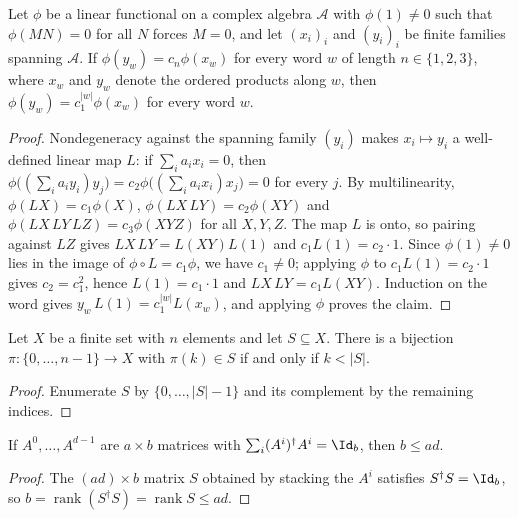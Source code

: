 \begin{lemma}
    \label{lem:block_symmetry_phase_power}
    \leanok
    Let $\phi$ be a linear functional on a complex algebra $\mathcal A$ with
    $\phi(1)\neq0$ such that $\phi(MN)=0$ for all $N$ forces $M=0$, and let
    $(x_i)_i$ and $(y_i)_i$ be finite families spanning $\mathcal A$. If
    $\phi(y_w)=c_n\phi(x_w)$ for every word $w$ of length $n\in\{1,2,3\}$,
    where $x_w$ and $y_w$ denote the ordered products along $w$, then
    $\phi(y_w)=c_1^{|w|}\phi(x_w)$ for every word $w$.
\end{lemma}
\begin{proof}
    \leanok
    Nondegeneracy against the spanning family $(y_i)$ makes $x_i\mapsto y_i$
    a well-defined linear map $L$: if $\sum_ia_ix_i=0$, then
    $\phi\bigl((\sum_ia_iy_i)y_j\bigr)=c_2\phi\bigl((\sum_ia_ix_i)x_j\bigr)=0$
    for every $j$. By multilinearity,
    $\phi(LX)=c_1\phi(X)$, $\phi(LX\,LY)=c_2\phi(XY)$ and
    $\phi(LX\,LY\,LZ)=c_3\phi(XYZ)$ for all $X,Y,Z$. The map $L$ is onto, so
    pairing against $LZ$ gives $LX\,LY=L(XY)L(1)$ and $c_1L(1)=c_2\cdot1$.
    Since $\phi(1)\neq0$ lies in the image of $\phi\circ L=c_1\phi$, we have
    $c_1\neq0$; applying $\phi$ to $c_1L(1)=c_2\cdot1$ gives $c_2=c_1^2$,
    hence $L(1)=c_1\cdot1$ and $LX\,LY=c_1L(XY)$. Induction on the word
    gives $y_w\,L(1)=c_1^{|w|}L(x_w)$, and applying $\phi$ proves the claim.
\end{proof}

\begin{lemma}
    \label{lem:perturbations_enumeration_subset_first}
    \leanok
    Let $X$ be a finite set with $n$ elements and let $S\subseteq X$. There is
    a bijection $\pi:\{0,\dots,n-1\}\to X$ with $\pi(k)\in S$ if and only if
    $k<|S|$.
\end{lemma}
\begin{proof}
    \leanok
    Enumerate $S$ by $\{0,\dots,|S|-1\}$ and its complement by the remaining
    indices.
\end{proof}

\begin{lemma}
    \label{thm:seqanc_rank_bound}
    \leanok
    If $A^0,\dots,A^{d-1}$ are $a\times b$ matrices with
    $\sum_i(A^i)^\dagger A^i=\Id_b$, then $b\le ad$.
\end{lemma}
\begin{proof}
    \leanok
    The $(ad)\times b$ matrix $S$ obtained by stacking the $A^i$ satisfies
    $S^\dagger S=\Id_b$, so $b=\operatorname{rank}(S^\dagger S)
        =\operatorname{rank}S\le ad$.
\end{proof}

